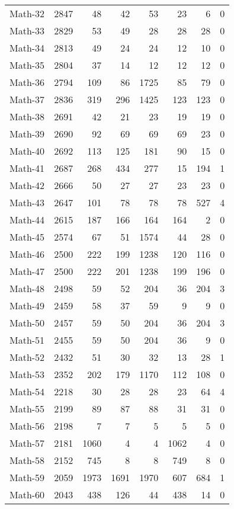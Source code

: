 \begin{footnotesize}
\begin{longtable}{lrrrrrrc}
Math-32 &  2847 & 48 & 42 & 53 & 23  & 6 & 0\\
Math-33 &  2829 & 53 & 49 & 28 & 28  & 28 & 0\\
Math-34 &  2813 & 49 & 24 & 24 & 12  & 10 & 0\\
Math-35 &  2804 & 37 & 14 & 12 & 12  & 12 & 0\\
Math-36 &  2794 & 109 & 86 & 1725 & 85  & 79 & 0\\
Math-37 &  2836 & 319 & 296 & 1425 & 123  & 123 & 0\\
Math-38 &  2691 & 42 & 21 & 23 & 19  & 19 & 0\\
Math-39 &  2690 & 92 & 69 & 69 & 69  & 23 & 0\\
Math-40 &  2692 & 113 & 125 & 181 & 90  & 15 & 0\\
Math-41 &  2687 & 268 & 434 & 277 & 15  & 194 & 1\\
Math-42 &  2666 & 50 & 27 & 27 & 23  & 23 & 0\\
Math-43 &  2647 & 101 & 78 & 78 & 78  & 527 & 4\\
Math-44 &  2615 & 187 & 166 & 164 & 164  & 2 & 0\\
Math-45 &  2574 & 67 & 51 & 1574 & 44  & 28 & 0\\
Math-46 &  2500 & 222 & 199 & 1238 & 120  & 116 & 0\\
Math-47 &  2500 & 222 & 201 & 1238 & 199  & 196 & 0\\
Math-48 &  2498 & 59 & 52 & 204 & 36  & 204 & 3\\
Math-49 &  2459 & 58 & 37 & 59 & 9  & 9 & 0\\
Math-50 &  2457 & 59 & 50 & 204 & 36  & 204 & 3\\
Math-51 &  2455 & 59 & 50 & 204 & 36  & 9 & 0\\
Math-52 &  2432 & 51 & 30 & 32 & 13  & 28 & 1\\
Math-53 &  2352 & 202 & 179 & 1170 & 112  & 108 & 0\\
Math-54 &  2218 & 30 & 28 & 28 & 23  & 64 & 4\\
Math-55 &  2199 & 89 & 87 & 88 & 31  & 31 & 0\\
Math-56 &  2198 & 7 & 7 & 5 & 5  & 5 & 0\\
Math-57 &  2181 & 1060 & 4 & 4 & 1062  & 4 & 0\\
Math-58 &  2152 & 745 & 8 & 8 & 749  & 8 & 0\\
Math-59 &  2059 & 1973 & 1691 & 1970 & 607  & 684 & 1\\
Math-60 &  2043 & 438 & 126 & 44 & 438  & 14 & 0\\

\end{longtable}
\end{footnotesize}
